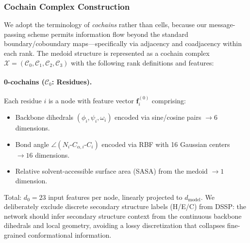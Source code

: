 \documentclass{article}
\begin{document}
\subsubsection{Cochain Complex Construction}
We adopt the terminology of \emph{cochains} rather than cells, because our message-passing scheme permits information flow beyond the standard boundary/coboundary maps---specifically via adjacency and coadjacency within each rank. The medoid structure is represented as a cochain complex $\mathcal{X} = (\mathcal{C}_0, \mathcal{C}_1, \mathcal{C}_2, \mathcal{C}_3)$ with the following rank definitions and features:

\paragraph{0-cochains ($\mathcal{C}_0$: Residues).} Each residue $i$ is a node with feature vector $\mathbf{f}_i^{(0)}$ comprising:
\begin{itemize}
    \item Backbone dihedrals $(\phi_i, \psi_i, \omega_i)$ encoded via sine/cosine pairs $\rightarrow 6$ dimensions.
    \item Bond angle $\angle(N_i\text{-}C_{\alpha,i}\text{-}C_i)$ encoded via RBF with 16 Gaussian centers $\rightarrow 16$ dimensions.
    \item Relative solvent-accessible surface area (SASA) from the medoid $\rightarrow 1$ dimension.
\end{itemize}
Total: $d_0 = 23$ input features per node, linearly projected to $d_{\text{model}}$. We deliberately exclude discrete secondary structure labels (H/E/C) from DSSP: the network should infer secondary structure context from the continuous backbone dihedrals and local geometry, avoiding a lossy discretization that collapses fine-grained conformational information.
\end{document}
